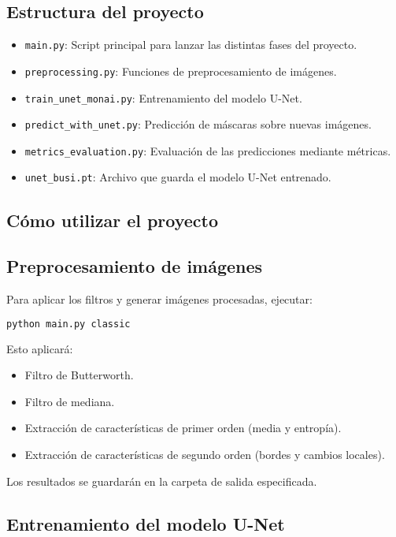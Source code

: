 \documentclass[12pt]{article}
\begin{document}
\subsection{Estructura del proyecto}

\begin{itemize}
    \item \texttt{main.py}: Script principal para lanzar las distintas fases del proyecto.
    \item \texttt{preprocessing.py}: Funciones de preprocesamiento de imágenes.
    \item \texttt{train\_unet\_monai.py}: Entrenamiento del modelo U-Net.
    \item \texttt{predict\_with\_unet.py}: Predicción de máscaras sobre nuevas imágenes.
    \item \texttt{metrics\_evaluation.py}: Evaluación de las predicciones mediante métricas.
    \item \texttt{unet\_busi.pt}: Archivo que guarda el modelo U-Net entrenado.
\end{itemize}

\subsection{Cómo utilizar el proyecto}

\subsection{Preprocesamiento de imágenes}

Para aplicar los filtros y generar imágenes procesadas, ejecutar:

\begin{lstlisting}[language=bash]
python main.py classic
\end{lstlisting}

Esto aplicará:
\begin{itemize}
    \item Filtro de Butterworth.
    \item Filtro de mediana.
    \item Extracción de características de primer orden (media y entropía).
    \item Extracción de características de segundo orden (bordes y cambios locales).
\end{itemize}

Los resultados se guardarán en la carpeta de salida especificada.

\subsection{Entrenamiento del modelo U-Net}
\end{document}
